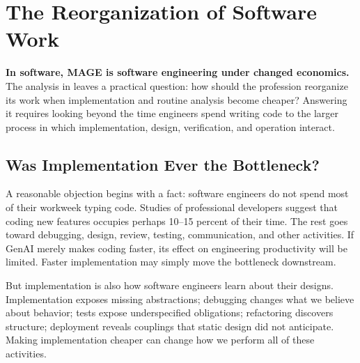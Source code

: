 


\chapter{The Reorganization of Software Work}

\textbf{In software, MAGE is software engineering under changed economics.} The analysis in  leaves a practical question: how should the profession reorganize its work when implementation and routine analysis become cheaper? Answering it requires looking beyond the time engineers spend writing code to the larger process in which implementation, design, verification, and operation interact.

\section{Was Implementation Ever the Bottleneck?}\label{heading:was-implementation-ever-the-bottleneck}

A reasonable objection begins with a fact: software engineers do not spend most of their workweek typing code. Studies of professional developers suggest that coding new features occupies perhaps 10--15 percent of their time. The rest goes toward debugging, design, review, testing, communication, and other activities. If GenAI merely makes coding faster, its effect on engineering productivity will be limited. Faster implementation may simply move the bottleneck downstream.

But implementation is also how software engineers learn about their designs. Implementation exposes missing abstractions; debugging changes what we believe about behavior; tests expose underspecified obligations; refactoring discovers structure; deployment reveals couplings that static design did not anticipate. Making implementation cheaper can change how we perform all of these activities.

